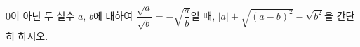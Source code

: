 $0$이 아닌 두 실수 $a$, $b$에 대하여 $\dfrac{\sqrt{a}}{\sqrt{b}}=-\sqrt{\dfrac{a}{b}}$일 때, $|a|+\sqrt{(a-b)^2}-\sqrt{b^2}$을 간단히 하시오.
